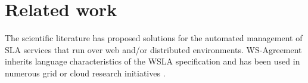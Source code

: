 \section{Related work}


The scientific literature has proposed solutions for the automated management of SLA services that run over web \cite{wsla} and/or distributed \cite{SNAP, wsag} environments. WS-Agreement \cite{wsag} inherits language characteristics of the WSLA specification and has been used in numerous grid or cloud research initiatives \cite{soi, lessons, butler}.

